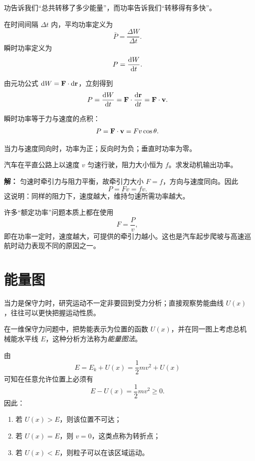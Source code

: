 功告诉我们“总共转移了多少能量”，而功率告诉我们“转移得有多快”。

\begin{definition}[平均功率与瞬时功率]
在时间间隔 $\Delta t$ 内，平均功率定义为
\[
\bar{P}=\frac{\Delta W}{\Delta t}.
\]
瞬时功率定义为
\[
P=\dv{W}{t}.
\]
\end{definition}

由元功公式 $\dd W=\vb{F}\cdot\dd\vb{r}$，立刻得到
\[
P=\dv{W}{t}=\vb{F}\cdot\dv{\vb{r}}{t}=\vb{F}\cdot\vb{v}.
\]

\begin{law}[功率公式]
瞬时功率等于力与速度的点积：
\[
P=\vb{F}\cdot \vb{v}=Fv\cos\theta.
\]
\end{law}

当力与速度同向时，功率为正；反向时为负；垂直时功率为零。

\begin{example}[汽车牵引功率]
汽车在平直公路上以速度 $v$ 匀速行驶，阻力大小恒为 $f$。求发动机输出功率。

\textbf{解：}
匀速时牵引力与阻力平衡，故牵引力大小 $F=f$，方向与速度同向。因此
\[
P=Fv=fv.
\]
这说明：同样的阻力下，速度越大，维持匀速所需功率越大。
\end{example}

\begin{remark}
许多“额定功率”问题本质上都在使用
\[
F=\frac{P}{v},
\]
即在功率一定时，速度越大，可提供的牵引力越小。这也是汽车起步爬坡与高速巡航时动力表现不同的原因之一。
\end{remark}

\section{能量图}\label{sec:energy-diagram}

当力是保守力时，研究运动不一定非要回到受力分析；直接观察势能曲线 $U(x)$，往往可以更快把握运动性质。

\begin{definition}[能量图]
在一维保守力问题中，把势能表示为位置的函数 $U(x)$，并在同一图上考虑总机械能水平线 $E$，这种分析方法称为\emph{能量图法}。
\end{definition}

由
\[
E=E_k+U(x)=\frac{1}{2}mv^2+U(x)
\]
可知在任意允许位置上必须有
\[
E-U(x)=\frac{1}{2}mv^2\ge 0.
\]
因此：
\begin{enumerate}
  \item 若 $U(x)>E$，则该位置不可达；
  \item 若 $U(x)=E$，则 $v=0$，这类点称为转折点；
  \item 若 $U(x)<E$，则粒子可以在该区域运动。
\end{enumerate}

